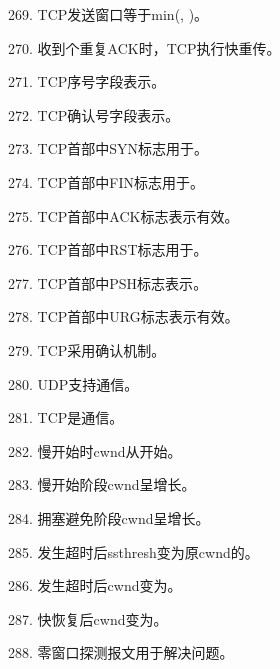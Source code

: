 269. TCP发送窗口等于min(\underline{\hspace{2cm}}, \underline{\hspace{2cm}})。

270. 收到\underline{\hspace{2cm}}个重复ACK时，TCP执行快重传。

271. TCP序号字段表示\underline{\hspace{4cm}}。

272. TCP确认号字段表示\underline{\hspace{4cm}}。

273. TCP首部中SYN标志用于\underline{\hspace{2cm}}。

274. TCP首部中FIN标志用于\underline{\hspace{2cm}}。

275. TCP首部中ACK标志表示\underline{\hspace{2cm}}有效。

276. TCP首部中RST标志用于\underline{\hspace{2cm}}。

277. TCP首部中PSH标志表示\underline{\hspace{2cm}}。

278. TCP首部中URG标志表示\underline{\hspace{2cm}}有效。

279. TCP采用\underline{\hspace{2cm}}确认机制。

280. UDP支持\underline{\hspace{2cm}}通信。

281. TCP是\underline{\hspace{2cm}}通信。

282. 慢开始时cwnd从\underline{\hspace{2cm}}开始。

283. 慢开始阶段cwnd呈\underline{\hspace{2cm}}增长。

284. 拥塞避免阶段cwnd呈\underline{\hspace{2cm}}增长。

285. 发生超时后ssthresh变为原cwnd的\underline{\hspace{2cm}}。

286. 发生超时后cwnd变为\underline{\hspace{2cm}}。

287. 快恢复后cwnd变为\underline{\hspace{2cm}}。

288. 零窗口探测报文用于解决\underline{\hspace{2cm}}问题。


